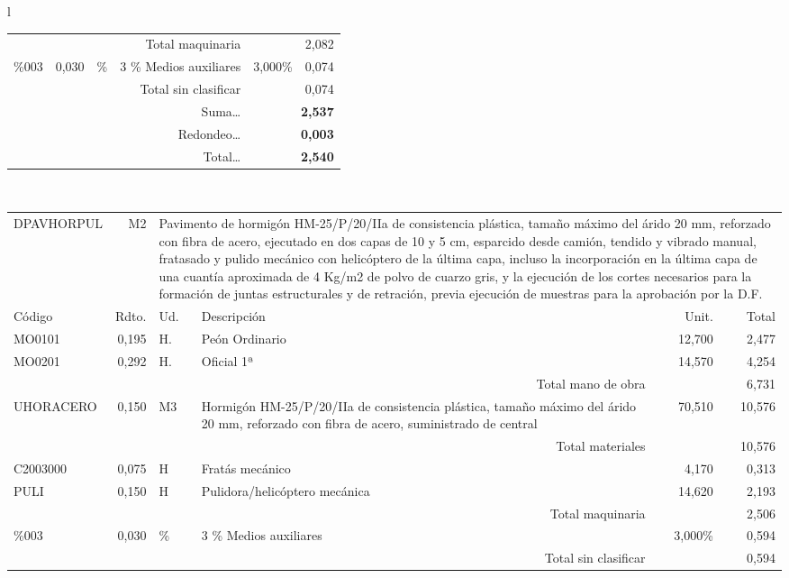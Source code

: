 \documentclass{book}%
\begin{document}
\begin{longtable}{l}
\begin{tabular}{l r l p{60mm} r r}
\multicolumn{4}{r}{Total maquinaria}&&     2,082\\%
\%003&     0,030&\%&3 \% Medios auxiliares&     3,000\%&     0,074\\%
\multicolumn{4}{r}{Total sin clasificar}&&     0,074\\%
\multicolumn{4}{r}{Suma\ldots}&\multicolumn{2}{r}{\textbf{     2,537}}\\%
\multicolumn{4}{r}{Redondeo\ldots}&\multicolumn{2}{r}{\textbf{     0,003}}\\%
\multicolumn{4}{r}{Total\ldots}&\multicolumn{2}{r}{\textbf{     2,540}}\\%
\end{tabular}\\%
\begin{tabular}{l r l p{60mm} r r}%
DPAVHORPUL&M2&\multicolumn{4}{p{95mm}}{Pavimento de hormigón HM{-}25/P/20/IIa de consistencia plástica, tamaño máximo del árido 20 mm, reforzado con fibra de acero, ejecutado en dos capas de 10 y 5 cm, esparcido desde camión, tendido y vibrado manual, fratasado y pulido mecánico con helicóptero de la última capa, incluso la incorporación en la última capa de una cuantía aproximada de 4 Kg/m2 de polvo de cuarzo gris, y la ejecución de los cortes necesarios para la formación de juntas estructurales y de retración, previa ejecución de muestras para la aprobación por la D.F.}\\%
Código&Rdto.&Ud.&Descripción&Unit.&Total\\%
\hline%
MO0101&     0,195&H.&Peón Ordinario&    12,700&     2,477\\%
MO0201&     0,292&H.&Oficial 1ª&    14,570&     4,254\\%
\multicolumn{4}{r}{Total mano de obra}&&     6,731\\%
UHORACERO&     0,150&M3&Hormigón HM{-}25/P/20/IIa de consistencia plástica, tamaño máximo del árido 20 mm, reforzado con fibra de acero, suministrado de central&    70,510&    10,576\\%
\multicolumn{4}{r}{Total materiales}&&    10,576\\%
C2003000&     0,075&H&Fratás mecánico&     4,170&     0,313\\%
PULI&     0,150&H&Pulidora/helicóptero mecánica&    14,620&     2,193\\%
\multicolumn{4}{r}{Total maquinaria}&&     2,506\\%
\%003&     0,030&\%&3 \% Medios auxiliares&     3,000\%&     0,594\\%
\multicolumn{4}{r}{Total sin clasificar}&&     0,594\\%

\end{tabular}
\end{longtable}
\end{document}
